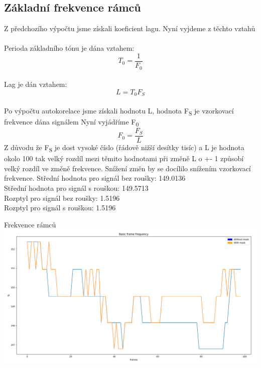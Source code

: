 \documentclass[12pt,czech]{article}
\begin{document}
    \subsection{Základní frekvence rámců}
        Z předchozího výpočtu jsme získali koeficient lagu. Nyní vyjdeme z těchto vztahů\\
        \\Perioda základního tónu je dána vztahem:\\
        \[T_0 = \frac{1}{F_0} \]
        \\Lag je dán vztahem: \\
        \[L = T_0 F_S \]
        \\Po výpočtu autokorelace jsme získali hodnotu L, hodnota F\textsubscript{S} je vzorkovací frekvence dána signálem
        Nyní vyjádříme F\textsubscript{0}
        \[F_0 = \frac{F_S}{L}\]
        Z důvodu že F\textsubscript{S} je dost vysoké číslo (řádově nižší desítky tisíc) a L je hodnota okolo 100 tak velký rozdíl mezi těmito hodnotami při změně L o +- 1 způsobí velký rozdíl ve změně frekvence. Snížení změn by se docílilo snížením vzorkovací frekvence.\newline\newline
        Střední hodnota pro signál bez roušky: 149.0136\\
        Střední hodnota pro signál s rouškou: 149.5713\\
        Rozptyl pro signál bez roušky:  1.5196\\
        Rozptyl pro signál s rouškou: 1.5196\\
        
        \begin{center}
            Frekvence rámců
            \hfill\includegraphics[scale=0.45]{images/freq0.png}\hspace*{\fill}
        \end{center}
\clearpage
\end{document}
